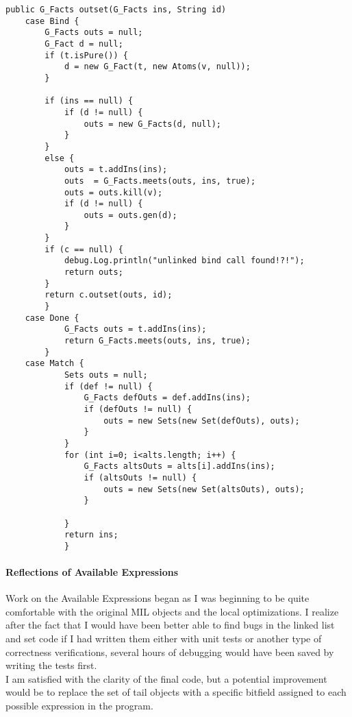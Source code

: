 \documentclass[14pt]{article}
\begin{document}
\begin{verbatim}
public G_Facts outset(G_Facts ins, String id)
    case Bind {
        G_Facts outs = null;
        G_Fact d = null;
        if (t.isPure()) {
            d = new G_Fact(t, new Atoms(v, null));
        }

        if (ins == null) {
            if (d != null) {
                outs = new G_Facts(d, null);
            }
        }
        else {
            outs = t.addIns(ins);
            outs  = G_Facts.meets(outs, ins, true);
            outs = outs.kill(v);
            if (d != null) {
                outs = outs.gen(d);
            }
        }
        if (c == null) {
            debug.Log.println("unlinked bind call found!?!");
            return outs;
        }
        return c.outset(outs, id);
        }
    case Done { 
            G_Facts outs = t.addIns(ins);
            return G_Facts.meets(outs, ins, true);
        }
    case Match {
            Sets outs = null;
            if (def != null) {
                G_Facts defOuts = def.addIns(ins);
                if (defOuts != null) {
                    outs = new Sets(new Set(defOuts), outs);
                }
            }
            for (int i=0; i<alts.length; i++) {
                G_Facts altsOuts = alts[i].addIns(ins);
                if (altsOuts != null) {
                    outs = new Sets(new Set(altsOuts), outs);
                }
                
            }
            return ins;
            }
\end{verbatim}
\paragraph{Reflections of Available Expressions}
Work on the Available Expressions began as I was beginning to be quite comfortable with the original MIL objects and the local optimizations. I realize after the fact that I would have been better able to find bugs in the linked list and set code if I had written them either with unit tests or another type of correctness verifications, several hours of debugging would have been saved by writing the tests first. \\
I am satisfied with the clarity of the final code, but a potential improvement would be to replace the set of tail objects with a specific bitfield assigned to each possible expression in the program.
\end{document}
